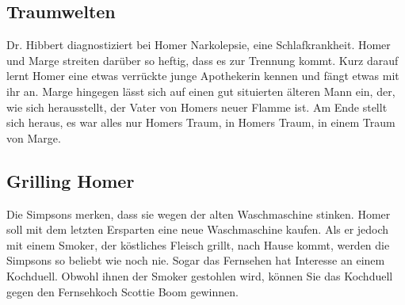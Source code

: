 \subsection{Traumwelten}
Dr. Hibbert diagnostiziert bei Homer Narkolepsie, eine Schlafkrankheit. Homer und Marge streiten darüber so heftig, dass es zur Trennung kommt. Kurz darauf lernt Homer eine etwas verrückte junge Apothekerin kennen und fängt etwas mit ihr an. Marge hingegen lässt sich auf einen gut situierten älteren Mann ein, der, wie sich herausstellt, der Vater von Homers neuer Flamme ist. Am Ende stellt sich heraus, es war alles nur Homers Traum, in Homers Traum, in einem Traum von Marge.


\subsection{Grilling Homer}
Die Simpsons merken, dass sie wegen der alten Waschmaschine stinken. Homer soll mit dem letzten Ersparten eine neue Waschmaschine kaufen. Als er jedoch mit einem Smoker, der köstliches Fleisch grillt, nach Hause kommt, werden die Simpsons so beliebt wie noch nie. Sogar das Fernsehen hat Interesse an einem Kochduell. Obwohl ihnen der Smoker gestohlen wird, können Sie das Kochduell gegen den Fernsehkoch Scottie Boom gewinnen.



